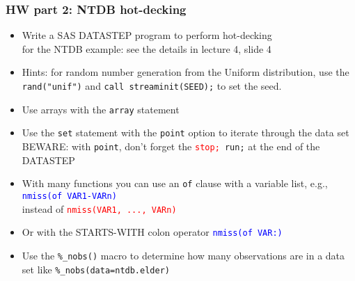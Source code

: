 \documentclass[11pt,pdftex,dvipsnames,usenames,helvetica]{beamer}
\begin{document}
\begin{frame}[fragile]
\frametitle{HW part 2: NTDB hot-decking}
\begin{itemize}
\item Write a SAS DATASTEP program to perform hot-decking\\
 for the NTDB example:
see the details in lecture 4, slide 4
\item Hints: for random number generation from the Uniform
  distribution, use the {\tt rand("unif")} and {\tt call
    streaminit(SEED);} to set the seed.
 \item Use arrays with the {\tt array} statement
 \item Use the {\tt set} statement with the {\tt point} option to
   iterate through the data set BEWARE: with {\tt point}, don't forget
   the {\tt \textcolor{red}{stop;} run;} at the end of the DATASTEP
\item With many functions you can use an {\tt of} clause with a variable
list, e.g., \textcolor{blue}{\tt nmiss(of VAR1-VARn)}\\
instead of \textcolor{red}{\tt nmiss(VAR1, ..., VARn)}
\item Or with the STARTS-WITH colon operator
 \textcolor{blue}{\tt nmiss(of VAR:)}
\item Use the {\tt \%\_nobs()} macro to determine how many
observations are in a data set like {\tt \%\_nobs(data=ntdb.elder)}
\end{itemize}
\end{frame}
\end{document}
